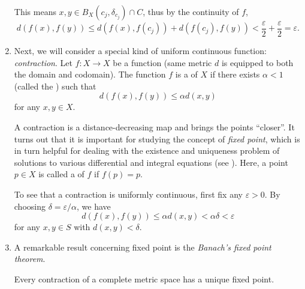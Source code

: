 \begin{enumerate}
\begin{pf}
This means \(x,y\in B_X(c_j,\delta_{c_j})\cap C\), thus by the continuity of
\(f\),
\[
d(f(x),f(y))\le d(f(x),f(c_j))+d(f(c_j),f(y))
<\frac{\varepsilon}{2}+\frac{\varepsilon}{2}=\varepsilon.
\]
\end{pf}

\item Next, we will consider a special kind of uniform continuous function:
\emph{contraction}. Let \(f:X\to X\) be a function (same metric \(d\) is
equipped to both the domain and codomain). The function \(f\) is a
 of \(X\) if there exists \(\alpha<1\) (called the
) such that
\[
d(f(x),f(y))\le\alpha d(x,y)
\]
for any \(x,y\in X\).
\begin{center}
\end{center}

A contraction is a distance-decreasing map and brings the points ``closer''. It
turns out that it is important for studying the concept of \emph{fixed point},
which is in turn helpful for dealing with the existence and uniqueness problem
of solutions to various differential and integral equations (see
). Here, a point \(p\in X\) is called a  of \(f\) if \(f(p)=p\).
\begin{center}
\end{center}

To see that a contraction is uniformly continuous, first fix any
\(\varepsilon>0\). By choosing \(\delta=\varepsilon/\alpha\), we have
\[
d(f(x),f(y))\le \alpha d(x,y)<\alpha\delta<\varepsilon
\]
for any \(x,y\in S\) with \(d(x,y)<\delta\).

\item A remarkable result concerning fixed point is the \emph{Banach's fixed
point theorem}.
\begin{theorem}
\label{thm:banach-fixed-pt}
Every contraction of a complete metric space has a unique fixed point.
\end{theorem}
\end{enumerate}
